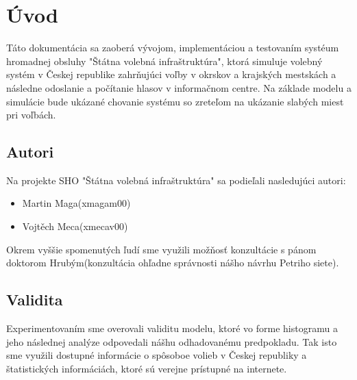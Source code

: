 \documentclass[12pt,a4paper,titlepage,final]{article}
\begin{document}


\tableofcontents
\newpage

\section{Úvod}
Táto dokumentácia sa zaoberá vývojom, implementáciou a testovaním systéum hromadnej obsluhy "Štátna volebná infraštruktúra", ktorá simuluje volebný systém v Českej republike zahrňujúci voľby v okrskov a krajských mestskách a následne odoslanie a počítanie hlasov v informačnom centre.
\indent
Na základe modelu a simulácie bude ukázané chovanie systému so zreteľom na ukázanie slabých miest pri voľbách.

\subsection{Autori}
Na projekte SHO "Štátna volebná infraštruktúra" sa podieľali nasledujúci autori:
\begin{itemize}
\item Martin Maga(xmagam00)
\item Vojtěch Meca(xmecav00)
\end{itemize}

Okrem vyššie spomenutých ľudí sme využili možňosť konzultácie s pánom doktorom Hrubým(konzultácia ohľadne správnosti nášho návrhu Petriho siete).
\subsection{Validita}
Experimentovaním sme overovali validitu modelu, ktoré vo forme histogramu a jeho následnej analýze odpovedali nášhu odhadovanému predpokladu. Tak isto sme využili dostupné informácie o spôsoboe volieb v Českej republiky a štatistických informáciách, ktoré sú verejne prístupné na internete.
\end{document}
